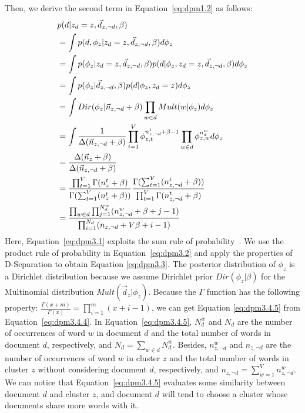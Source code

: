 Then, we derive the second term in Equation~\eqref{eq:dpm1.2} as follows:
\begin{align}
    & \notag
    p(d | z_d=z, \vec{d}_{z, \neg{d}}, \beta)\\
    & \label{eq:dpm3.1}
    = \int{p(d, \phi_z | z_d=z, \vec{d}_{z, \neg{d}}, \beta)d\phi_z}\\
    & \label{eq:dpm3.2}
    = \int{p(\phi_z | z_d=z, \vec{d}_{z, \neg{d}}, \beta)
           p(d | \phi_z, z_d=z, \vec{d}_{z, \neg{d}}, \beta)
           d\phi_z}\\
    & \label{eq:dpm3.3}
    = \int{p(\phi_z | \vec{d}_{z, \neg{d}}, \beta)
           p(d | \phi_z, z_d=z)
           d\phi_z}\\
    & \label{eq:dpm3.4.1}
    = \int{Dir(\phi_z | \vec{n}_{z,\neg{d}} + \beta)
           \prod_{w \in d} Mult(w | \phi_z)
           d\phi_z}\\
    & \label{eq:dpm3.4.2}
    = \int{\frac{1}{\Delta(\vec{n}_{z,\neg{d}} + \beta)}
            \prod_{t=1}^V \phi_{z,t}^{n_{z,\neg{d}}^t + \beta - 1}
           \prod_{w \in d} \phi_{z,w}^{n_d^w}
            d\phi_z}\\
    & \label{eq:dpm3.4.3}
    = \frac{\Delta(\vec{n}_z + \beta)}
           {\Delta(\vec{n}_{z,\neg{d}} + \beta)}\\
    & \label{eq:dpm3.4.4}
    = \frac{\prod_{t=1}^V \Gamma(n_z^t + \beta)}
            {\Gamma(\sum_{t=1}^V (n_z^t + \beta))}
      \frac{\Gamma(\sum_{t=1}^V (n_{z,\neg{d}}^t + \beta))}
            {\prod_{t=1}^V \Gamma(n_{z,\neg{d}}^t + \beta)} \\
    & \label{eq:dpm3.4.5}
    =  \frac{\prod_{w \in d} \prod_{j=1}^{N_d^w} (n_{z,\neg{d}}^w + \beta + j - 1)}
           {\prod_{i=1}^{N_d} (n_{z,\neg{d}} + V\beta + i - 1)}
\end{align}
Here, Equation~\eqref{eq:dpm3.1} exploits the sum rule of probability~\cite{bishop2006pattern}. We use the product rule of probability in Equation~\eqref{eq:dpm3.2} and apply the properties of D-Separation \cite{bishop2006pattern} to obtain Equation \eqref{eq:dpm3.3}.
The posterior distribution of $\phi_z$ is a Dirichlet distribution because we assume Dirichlet prior $Dir(\phi_z | \beta)$ for the Multinomial distribution $Mult(\vec{d}_z | \phi_z)$. Because the $\Gamma$ function has the following property: $\frac{\Gamma(x+m)}{\Gamma(x)} = \prod_{i=1}^m(x+i-1)$, we can get Equation \eqref{eq:dpm3.4.5} from Equation~\eqref{eq:dpm3.4.4}.
In Equation~\eqref{eq:dpm3.4.5}, $N_d^w$ and $N_d$ are the number of occurrences of word $w$ in document $d$ and the total number of words in document $d$, respectively, and $N_d = \sum_{w \in d} N_d^w$.
Besides, $n_{z,\neg{d}}^w$ and $n_{z,\neg{d}}$ are the number of occurrences of word $w$ in cluster $z$ and the total number of words in cluster $z$ without considering document $d$, respectively, and $n_{z,\neg{d}} = \sum_{w=1}^V n_{z,\neg{d}}^w$.
We can notice that Equation~\eqref{eq:dpm3.4.5} evaluates some similarity between document $d$ and cluster $z$, and document $d$ will tend to choose a cluster whose documents share more words with it.

